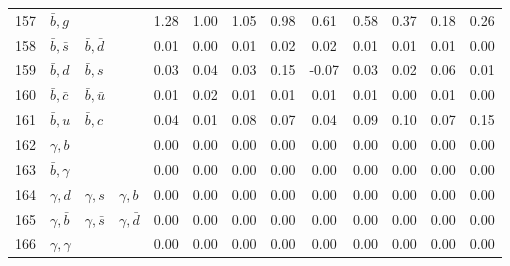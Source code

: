 \begin{tabularx}{\textwidth}{rXXX@{}S@{}S@{}S@{}S@{}S@{}S@{}S@{}S@{}S}
157 & $\bar b, g$      &                   &                  &  1.28 &  1.00 &  1.05 &  0.98 &  0.61 &  0.58 &  0.37 &  0.18 &  0.26 \\
158 & $\bar b, \bar s$ & $\bar b, \bar d$  &                  &  0.01 &  0.00 &  0.01 &  0.02 &  0.02 &  0.01 &  0.01 &  0.01 &  0.00 \\
159 & $\bar b, d$      & $\bar b, s$       &                  &  0.03 &  0.04 &  0.03 &  0.15 & -0.07 &  0.03 &  0.02 &  0.06 &  0.01 \\
160 & $\bar b, \bar c$ & $\bar b, \bar u$  &                  &  0.01 &  0.02 &  0.01 &  0.01 &  0.01 &  0.01 &  0.00 &  0.01 &  0.00 \\
161 & $\bar b, u$      & $\bar b, c$       &                  &  0.04 &  0.01 &  0.08 &  0.07 &  0.04 &  0.09 &  0.10 &  0.07 &  0.15 \\
162 & $\gamma, b$      &                   &                  &  0.00 &  0.00 &  0.00 &  0.00 &  0.00 &  0.00 &  0.00 &  0.00 &  0.00 \\
163 & $\bar b, \gamma$ &                   &                  &  0.00 &  0.00 &  0.00 &  0.00 &  0.00 &  0.00 &  0.00 &  0.00 &  0.00 \\
164 & $\gamma,  d$     & $\gamma, s$       & $\gamma, b$      &  0.00 &  0.00 &  0.00 &  0.00 &  0.00 &  0.00 &  0.00 &  0.00 &  0.00 \\
165 & $\gamma, \bar b$ & $\gamma, \bar s$  & $\gamma, \bar d$ &  0.00 &  0.00 &  0.00 &  0.00 &  0.00 &  0.00 &  0.00 &  0.00 &  0.00 \\
166 & $\gamma, \gamma$ &                   &                  &  0.00 &  0.00 &  0.00 &  0.00 &  0.00 &  0.00 &  0.00 &  0.00 &  0.00 \\
\bottomrule
\end{tabularx}

